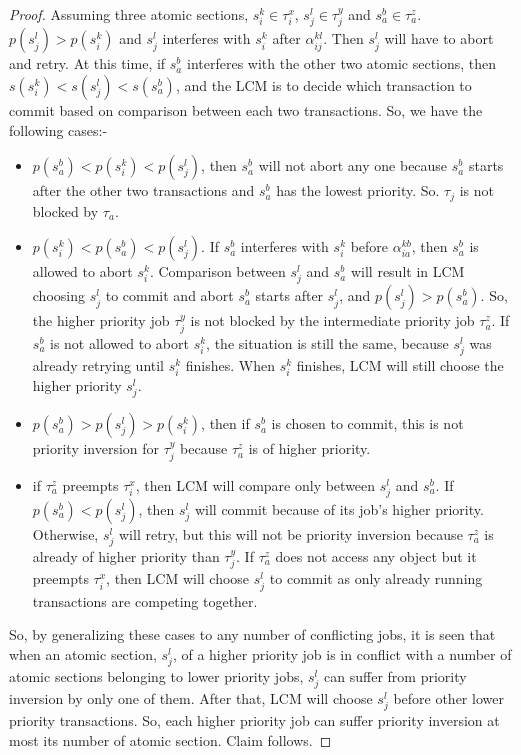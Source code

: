 \begin{proof}\normalfont
Assuming three atomic sections, $s_i^k \in \tau_i^x$, $s_j^l \in \tau_j^y$ and $s_a^b \in \tau_a^z$. $p\left(s_j^l\right) > p\left(s_i^k\right)$ and $s_j^l$ interferes with $s_i^k$ after $\alpha_{ij}^{kl}$. Then $s_j^l$ will have to abort and retry. At this time, if $s_a^b$ interferes with the other two atomic sections, then $s\left(s_i^k\right) < s\left(s_j^l\right) < s\left(s_a^b\right)$, and the LCM is to decide which transaction to commit based on comparison between each two transactions. So, we have the following cases:-
\begin{itemize}
\item $p\left(s_a^b\right) < p\left(s_i^k\right) < p\left(s_j^l\right)$, then $s_a^b$ will not abort any one because $s_a^b$ starts after the other two transactions and $s_a^b$ has the lowest priority. So. $\tau_j$ is not blocked by $\tau_a$.
\item $p\left(s_i^k\right) < p\left(s_a^b\right) < p\left(s_j^l\right)$. If $s_a^b$ interferes with $s_i^k$ before $\alpha_{ia}^{kb}$, then $s_a^b$ is allowed to abort $s_i^k$. Comparison between $s_j^l$ and $s_a^b$ will result in LCM choosing $s_j^l$ to commit and abort $s_a^b$ starts after $s_j^l$, and $p\left(s_j^l\right) > p\left(s_a^b\right)$. So, the higher priority job $\tau_j^y$ is not blocked by the intermediate priority job $\tau_a^z$. If $s_a^b$ is not allowed to abort $s_i^k$, the situation is still the same, because $s_j^l$ was already retrying until $s_i^k$ finishes. When $s_i^k$ finishes, LCM will still choose the higher priority $s_j^l$.
\item $p\left(s_a^b\right) > p\left(s_j^l\right) > p\left(s_i^k\right)$, then if $s_a^b$ is chosen to commit, this is not priority inversion for $\tau_j^y$ because $\tau_a^z$ is of higher priority.
\item if $\tau_a^z$ preempts $\tau_i^x$, then LCM will compare only between $s_j^l$ and $s_a^b$. If $p\left(s_a^b\right)<p\left(s_j^l\right)$, then $s_j^l$ will commit because of its job's higher priority. Otherwise, $s_j^l$ will retry, but this will not be priority inversion because $\tau_a^z$ is already of higher priority than $\tau_j^y$. If $\tau_a^z$ does not access any object but it preempts $\tau_i^x$, then LCM will choose $s_j^l$ to commit as only already running transactions are competing together.
\end{itemize}
So, by generalizing these cases to any number of conflicting jobs, it is seen that when an atomic section, $s_j^l$, of a higher priority job is in conflict with a number of atomic sections belonging to lower priority jobs, $s_j^l$ can suffer from priority inversion by only one of them. After that, LCM will choose $s_j^l$ before other lower priority transactions. So, each higher priority job can suffer priority inversion at most its number of atomic section. Claim follows.
\end{proof}
